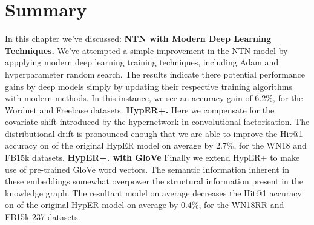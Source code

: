 
\section{Summary}

In this chapter we've discussed: \newline
\textbf{NTN with Modern Deep Learning Techniques.} We've attempted a simple improvement in the NTN model by appplying modern deep learning training techniques, including Adam and hyperparameter random search. The results indicate there potential performance gains by deep models simply by updating their respective training algorithms with modern methods. In this instance, we see an accuracy gain of 6.2\%, for the Wordnet and Freebase datasets. \newline
\textbf{HypER+.}  Here we compensate for the covariate shift introduced by the hypernetwork in convolutional factorisation. The distributional drift is pronounced enough that we are able to improve the Hit@1 accuracy on of the original HypER model on average by 2.7\%, for the WN18 and FB15k datasets.\newline
\textbf{HypER+. with GloVe} Finally we extend HypER+ to make use of pre-trained GloVe word vectors. The semantic information inherent in these embeddings somewhat overpower the structural information present in the knowledge graph. The resultant model on average decreases the Hit@1 accuracy on of the original HypER model on average by 0.4\%, for the WN18RR and FB15k-237 datasets. \newline
